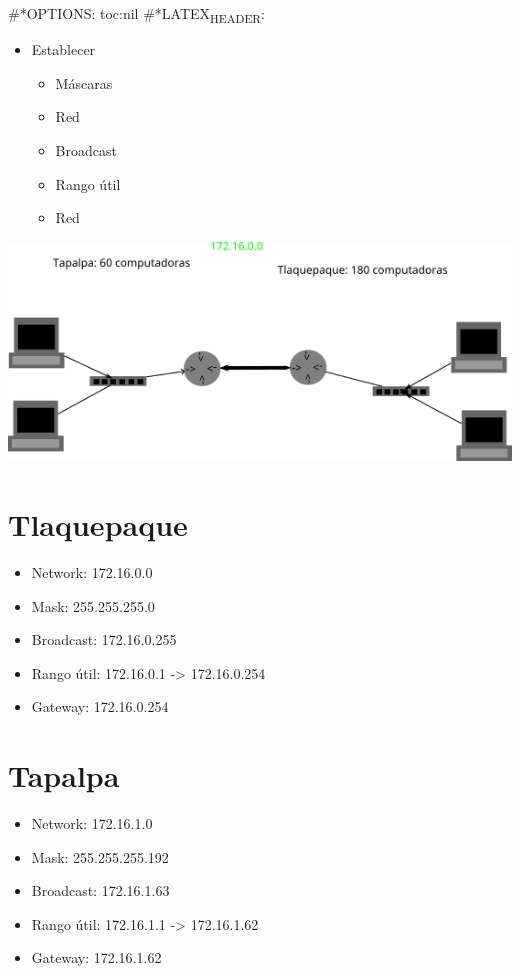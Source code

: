 \documentclass[11pt]{article}
\author{Diego Domínguez}
\date{\today}
\title{}
\begin{document}
\tableofcontents

\#*OPTIONS: toc:nil
\#*LATEX\textsubscript{HEADER}: 

\begin{itemize}
\item Establecer
\begin{itemize}
\item Máscaras
\item Red
\item Broadcast
\item Rango útil
\item Red
\end{itemize}
\end{itemize}

\begin{center}
\includegraphics[width=.9\linewidth]{./ejercicio.png}
\end{center}


\section{Tlaquepaque}
\label{sec:orgaf0c3e6}
\begin{itemize}
\item Network: 172.16.0.0
\item Mask: 255.255.255.0
\item Broadcast: 172.16.0.255
\item Rango útil: 172.16.0.1 -> 172.16.0.254
\item Gateway: 172.16.0.254
\end{itemize}

\section{Tapalpa}
\label{sec:orgc82810c}
\begin{itemize}
\item Network: 172.16.1.0
\item Mask: 255.255.255.192
\item Broadcast: 172.16.1.63
\item Rango útil: 172.16.1.1 -> 172.16.1.62
\item Gateway: 172.16.1.62
\end{itemize}
\end{document}
